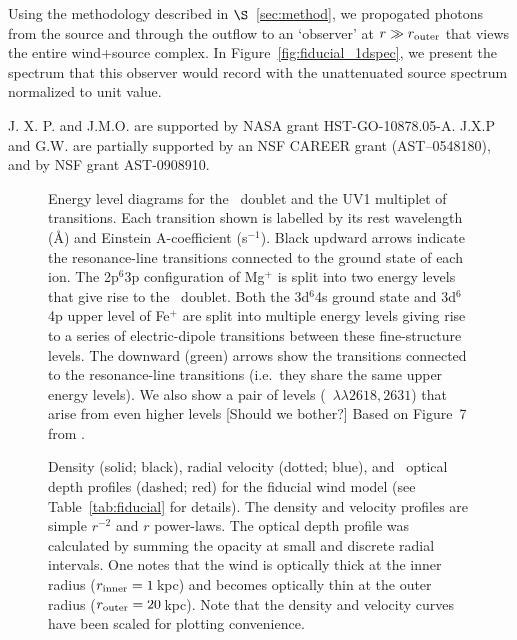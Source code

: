 \documentclass[12pt,preprint]{aastex}
\begin{document}
Using the methodology described in $\S$~\ref{sec:method}, we
propogated photons from the source and through the outflow to an
`observer' at $r \gg r_{\rm outer}$ that views the entire wind+source
complex.  In Figure~\ref{fig:fiducial_1dspec}, we present the spectrum
that this observer would record with the unattenuated source spectrum
normalized to unit value.  


\acknowledgments

J. X. P. and J.M.O. are supported by NASA grant
HST-GO-10878.05-A.  J.X.P and G.W. are partially supported
by an NSF CAREER grant (AST--0548180), and 
by NSF grant AST-0908910.







\begin{figure}
\caption{
Energy level diagrams for the \mgiid\ doublet and the UV1
multiplet of  transitions.   Each transition shown is
labelled by its rest wavelength (\AA) and Einstein A-coefficient
(s$^{-1}$). Black updward arrows
indicate the resonance-line transitions connected to the ground
state of each ion.  The 2p$^6$3p configuration of Mg$^+$ is split into
two energy levels that give rise to the \mgiid\ doublet.  
Both the 3d$^6$4s ground state and 3d$^6$4p upper level of Fe$^+$
are split into multiple energy levels giving rise to a series of
electric-dipole transitions between these fine-structure levels.   
The downward (green) arrows show the transitions connected to the
resonance-line transitions (i.e.\ they share the same upper energy
levels).  We also show a pair of levels (~$\lambda\lambda
2618,2631$) that arise from even higher levels [Should we bother?]
Based on Figure~7 from \cite{hartagan9X}.
}
\label{fig:energy}
\end{figure}

\begin{figure}
\caption{
Density (solid; black), radial velocity (dotted; blue), and
\mgiia\ optical depth profiles (dashed; red) for the fiducial
wind model (see Table~\ref{tab:fiducial} for details).
The density and velocity profiles are simple $r^{-2}$ and $r$
power-laws.  The optical depth profile was calculated by summing
the opacity at small and discrete radial intervals.  One notes that
the wind is optically thick at the inner radius ($r_{\rm inner} =
1$\,kpc) and becomes optically thin at the outer radius ($r_{\rm
  outer} = 20$\,kpc).
Note that the density and velocity curves have been scaled for plotting
convenience.  
}
\label{fig:fiducial_nvt}
\end{figure}
\end{document}
